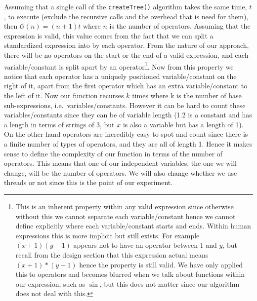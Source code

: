 \documentclass[../../../../../main.tex]{subfiles}
\begin{document}
Assuming that a single call of the \texttt{createTree()} algorithm takes the same time, $t$, to execute (exclude the recursive calls and the overhead that is need for them), then $\mathcal{O}(n) = (n+1)t$ where $n$ is the number of operators. Assuming that the expression is valid, this value comes from the fact that we can split a standardized expression into by each operator. From the nature of our approach, there will be no operators on the start or the end of a valid expression, and each variable/constant is split apart by an operator\footnote{This is an inherent property within any valid expression since otherwise without this we cannot separate each variable/constant hence we cannot define explicitly where each variable/constant starts and ends. Within human expressions this is more implicit but still exists. For example $(x+1)(y-1)$ appears not to have an operator between 1 and $y$, but recall from the design section that this expression actual means $(x+1)*(y-1)$ hence the property is still valid. We have only applied this to operators and becomes blurred when we talk about functions within our expression, such as $\sin$, but this does not matter since our algorithm does not deal with this.}. 
Now from this property we notice that each operator has a uniquely positioned variable/constant on the right of it, apart from the first operator which has an extra variable/constant to the left of it. Now our function recurses $k$ times where k is the number of base sub-expressions, i.e.\ variables/constants. However it can be hard to count these variables/constants since they can be of variable length (1.2 is a constant and has a length in terms of strings of 3, but $x$ is also a variable but has a length of 1). On the other hand operators are incredibly easy to spot and count since there is a finite number of types of operators, and they are all of length 1. Hence it makes sense to define the complexity of our function in terms of the number of operators. This means that one of our independent variables, the one we will change, will be the number of operators. We will also change whether we use threads or not since this is the point of our experiment.
 
\end{document}
